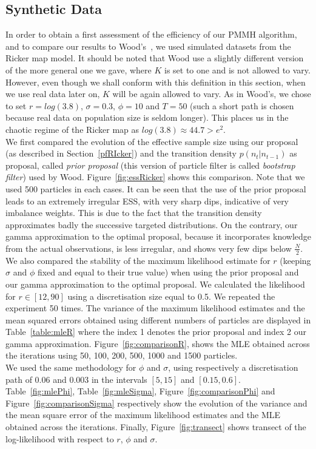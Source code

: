 \documentclass{article}
\begin{document}
	
	\subsection{Synthetic Data}
	In order to obtain a first assessment of the efficiency of our PMMH algorithm, and to compare our results to Wood's~\cite{fasiolo2014statistical}, we used simulated datasets from the Ricker map model. It should be noted that Wood use a slightly different version of the more general one we gave, where $K$ is set to one and is not allowed to vary. However, even though we shall conform with this definition in this section, when we use real data later on, $K$ will be again allowed to vary. As in Wood's, we chose to set $r=log(3.8)$, $\sigma=0.3$, $\phi=10$ and $T=50$ (such a short path is chosen because real data on population size is seldom longer). This places us in the  chaotic regime of the Ricker map as $log(3.8) \approx 44.7 > e^2$. \\
	
	We first compared the evolution of the effective sample size using our proposal (as described in Section~\ref{pfRIcker}) and the transition density $p(n_t|n_{t-1})$ as proposal, called \emph{prior proposal} (this version of particle filter is called \emph{bootstrap filter}) used by Wood. Figure~\ref{fig:essRicker} shows this comparison. Note that we used 500 particles in each cases. It can be seen that the use of the prior proposal leads to an extremely irregular ESS, with very sharp dips, indicative of very imbalance weights. This is due to the fact that the transition density approximates badly the successive targeted distributions. On the contrary, our gamma approximation to the optimal proposal, because it incorporates knowledge from the actual observations, is less irregular, and shows very few dips below $\frac{N}{2}$. \\
	
	We also compared the stability of the maximum likelihood estimate for $r$ (keeping $\sigma$ and $\phi$ fixed and equal to their true value) when using the prior proposal and our gamma approximation to the optimal proposal. We calculated the likelihood for $r \in [12, 90]$ using a discretisation size equal to 0.5. We repeated the experiment 50 times. The variance of the maximum likelihood estimates and the mean squared errors obtained using different numbers of particles are displayed in Table~\ref{table:mleR} where the index 1 denotes the prior proposal and index 2 our gamma approximation. Figure~\ref{fig:comparisonR}, shows the MLE obtained across the iterations using 50, 100, 200, 500, 1000 and 1500 particles. \\
	We used the same methodology for $\phi$ and $\sigma$, using respectively a discretisation path of 0.06 and 0.003 in the intervals $[5, 15]$ and $[0.15, 0.6]$. Table~\ref{fig:mlePhi}, Table~\ref{fig:mleSigma}, Figure~\ref{fig:comparisonPhi} and Figure~\ref{fig:comparisonSigma} respectively show the evolution of the variance and the mean square error of the maximum likelihood estimates and the MLE obtained across the iterations. Finally, Figure~\ref{fig:transect} shows transect of the log-likelihood with respect to $r$, $\phi$ and $\sigma$. 
	
\end{document}
